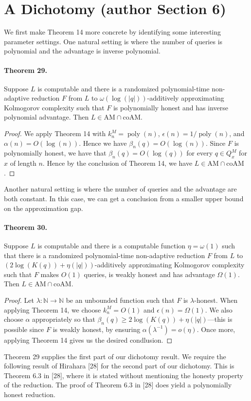 \section*{A Dichotomy (author Section 6)}
We first make Theorem 14 more concrete by identifying some interesting parameter settings. One natural setting is where the number of queries is polynomial and the advantage is inverse polynomial.
\paragraph{Theorem 29.} Suppose $L$ is computable and there is a randomized polynomial-time non-adaptive reduction $F$ from $L$ to $\omega(\log(|q|))$-additively approximating Kolmogorov complexity such that $F$ is polynomially honest and has inverse polynomial advantage. Then $L\in\mathrm{AM}\cap\mathrm{coAM}$.
\begin{proof}We apply Theorem 14 with $k_n^M=\operatorname{poly}(n)$, $\epsilon(n)=1/\operatorname{poly}(n)$, and $\alpha(n)=O(\log(n))$. Hence we have $\beta_n(q)=O(\log(n))$. Since $F$ is polynomially honest, we have that $\beta_n(q)=O(\log(q))$ for every $q\in Q_x^M$ for $x$ of length $n$. Hence by the conclusion of Theorem 14, we have $L\in\mathrm{AM}\cap\mathrm{coAM}$.\end{proof}
Another natural setting is where the number of queries and the advantage are both constant. In this case, we can get a conclusion from a smaller upper bound on the approximation gap.
\paragraph{Theorem 30.} Suppose $L$ is computable and there is a computable function $\eta=\omega(1)$ such that there is a randomized polynomial-time non-adaptive reduction $F$ from $L$ to $(2\log(K(q))+\eta(|q|))$-additively approximating Kolmogorov complexity such that $F$ makes $O(1)$ queries, is weakly honest and has advantage $\Omega(1)$. Then $L\in\mathrm{AM}\cap\mathrm{coAM}$.
\begin{proof}Let $\lambda:\mathbb N\to\mathbb N$ be an unbounded function such that $F$ is $\lambda$-honest. When applying Theorem 14, we choose $k_n^M=O(1)$ and $\epsilon(n)=\Omega(1)$. We also choose $\alpha$ appropriately so that $\beta_n(q)\ge2\log(K(q))+\eta(|q|)$---this is possible since $F$ is weakly honest, by ensuring $\alpha(\lambda^{-1})=o(\eta)$. Once more, applying Theorem 14 gives us the desired condlusion.\end{proof}
Theorem 29 supplies the first part of our dichotomy result. We require the following result of Hirahara [28] for the second part of our dichotomy. This is Theorem 6.3 in [28], where it is stated without mentioning the honesty property of the reduction. The proof of Theorem 6.3 in [28] does yield a polynomially honest reduction.
